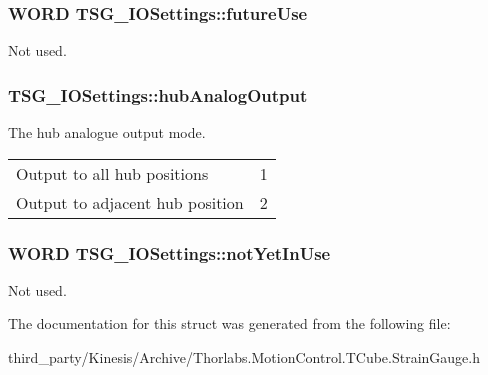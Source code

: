 \subsubsection[{\texorpdfstring{future\+Use}{futureUse}}]{\setlength{\rightskip}{0pt plus 5cm}W\+O\+RD T\+S\+G\+\_\+\+I\+O\+Settings\+::future\+Use}\hypertarget{struct_t_s_g___i_o_settings_aab7e1ce301fe70c6530128f0678df59b}{}\label{struct_t_s_g___i_o_settings_aab7e1ce301fe70c6530128f0678df59b}


Not used. 

\subsubsection[{\texorpdfstring{hub\+Analog\+Output}{hubAnalogOutput}}]{ T\+S\+G\+\_\+\+I\+O\+Settings\+::hub\+Analog\+Output}\hypertarget{struct_t_s_g___i_o_settings_a36641cf65c931df8d597e34e173a4c7f}{}\label{struct_t_s_g___i_o_settings_a36641cf65c931df8d597e34e173a4c7f}


The hub analogue output mode. \tabulinesep=1mm
\begin{longtabu} spread 0pt [c]{*2{|X[-1]}|}
\hline
Output to all hub positions&1 \\
Output to adjacent hub position&2 \\
\end{longtabu}


\subsubsection[{\texorpdfstring{not\+Yet\+In\+Use}{notYetInUse}}]{\setlength{\rightskip}{0pt plus 5cm}W\+O\+RD T\+S\+G\+\_\+\+I\+O\+Settings\+::not\+Yet\+In\+Use}\hypertarget{struct_t_s_g___i_o_settings_a54c57426206aae2ef70798f43bc8ae27}{}\label{struct_t_s_g___i_o_settings_a54c57426206aae2ef70798f43bc8ae27}


Not used. 



The documentation for this struct was generated from the following file\+:\begin{DoxyCompactItemize}
\item 
third\+\_\+party/\+Kinesis/\+Archive/Thorlabs.\+Motion\+Control.\+T\+Cube.\+Strain\+Gauge.\+h\end{DoxyCompactItemize}
